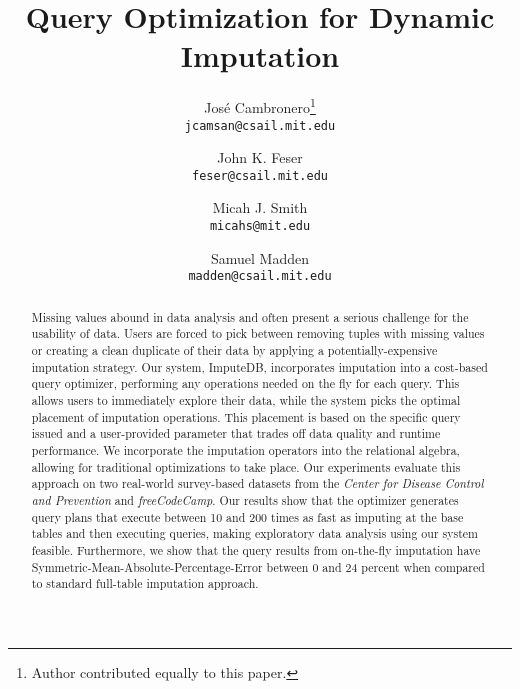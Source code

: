 \documentclass{vldb}
\title{Query Optimization for Dynamic Imputation}
\author{
  Jos\'e Cambronero\thanks{Author contributed equally to this paper.} \\
  \texttt{jcamsan@csail.mit.edu}
  \and
  John K. Feser\footnotemark[1] \\
  \texttt{feser@csail.mit.edu}
  \and
  Micah J. Smith\footnotemark[1] \\
  \texttt{micahs@mit.edu}
  \and
  Samuel Madden \\
  \texttt{madden@csail.mit.edu}}
\newcommand{\ProjectName}{ImputeDB\xspace}
\newcommand{\lowxalphazero}{10}
\newcommand{\lowsmapealphazero}{0}
\newcommand{\highxalphazeroexacs}{200}
\newcommand{\highsmapealphaoneexacs}{24}
\begin{document}
\maketitle

\begin{abstract}
Missing values abound in data analysis and often present a serious challenge for the usability of data. Users
are forced to pick between removing tuples with missing values or creating a clean duplicate of their data
by applying a potentially-expensive imputation strategy. Our system, \ProjectName{}, incorporates imputation into a cost-based query optimizer, 
performing any operations needed on the fly
for each query. This allows users to immediately explore
their data, while the system picks the optimal placement of imputation operations. This placement is based
on the specific query issued and a user-provided parameter that trades off data
quality and runtime performance. We incorporate the imputation operators into the relational algebra, allowing
for traditional optimizations to take place. Our experiments evaluate this approach on two real-world survey-based datasets
from the \textit{Center for Disease Control and Prevention} and \textit{freeCodeCamp}. Our
results show that the optimizer generates query plans that execute between \lowxalphazero{}
and \highxalphazeroexacs{} times as fast as imputing at the base tables and then executing
queries, making exploratory data analysis using our system feasible.  Furthermore, we show
that the query results from on-the-fly imputation have
Symmetric-Mean-Absolute-Percentage-Error between \lowsmapealphazero{} and
\highsmapealphaoneexacs{} percent when compared to standard full-table imputation
approach.

\end{abstract}







\balance
\printbibliography
\end{document}
